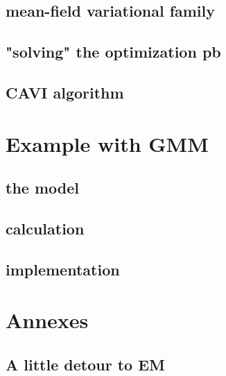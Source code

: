 \documentclass{article}
\begin{document}
\subsection{mean-field variational family}
\subsection{"solving" the optimization pb}
\subsection{CAVI algorithm}

\section{Example with GMM}
\subsection{the model}
\subsection{calculation}
\subsection{implementation}




\section{Annexes}
\subsection{A little detour to EM}
\end{document}

